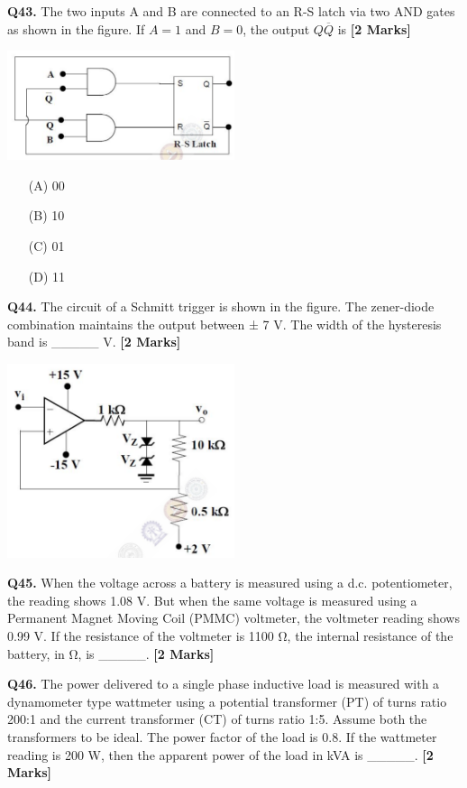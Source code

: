 \documentclass[11pt]{article}
\newcommand{\questionb}[2]{
    \noindent\textbf{Q#2.} #1 \hfill \textbf{[2 Marks]}
}
\begin{document}
\questionb{The two inputs A and B are connected to an R-S latch via two AND gates as shown in the figure. If \( A = 1 \) and \( B = 0 \), the output \( Q\overline{Q} \) is}{43}
\begin{center}
\includegraphics[width=0.5\textwidth]{figures/43.png}
\end{center}
\begin{enumerate}
    \item[(A)] 00  
    \item[(B)] 10  
    \item[(C)] 01  
    \item[(D)] 11
\end{enumerate}
\vspace{0.5cm}

\questionb{The circuit of a Schmitt trigger is shown in the figure. The zener-diode combination maintains the output between ± 7 V. The width of the hysteresis band is \_\_\_\_\_ V.}{44}
\begin{center}
\includegraphics[width=0.5\textwidth]{figures/44.png}
\end{center}
\vspace{0.5cm}

\questionb{When the voltage across a battery is measured using a d.c. potentiometer, the reading shows 1.08 V. But when the same voltage is measured using a Permanent Magnet Moving Coil (PMMC) voltmeter, the voltmeter reading shows 0.99 V. If the resistance of the voltmeter is 1100 Ω, the internal resistance of the battery, in Ω, is \_\_\_\_\_.}{45}
\vspace{0.5cm}

\questionb{The power delivered to a single phase inductive load is measured with a dynamometer type wattmeter using a potential transformer (PT) of turns ratio 200:1 and the current transformer (CT) of turns ratio 1:5. Assume both the transformers to be ideal. The power factor of the load is 0.8. If the wattmeter reading is 200 W, then the apparent power of the load in kVA is \_\_\_\_\_.}{46}
\vspace{0.5cm}
\end{document}
